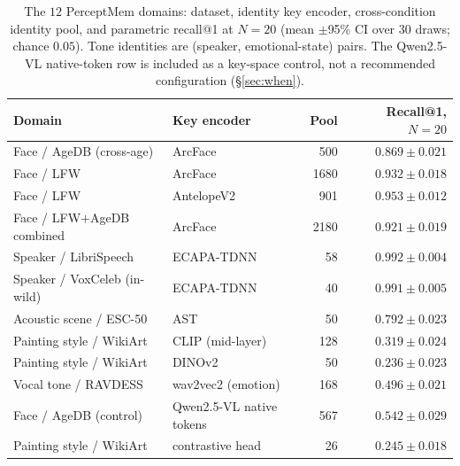\begin{table}[h]
\small\centering
\caption{The $12$ PerceptMem domains: dataset, identity key encoder, cross-condition identity pool, and parametric recall@1 at $N{=}20$ (mean $\pm$95\% CI over $30$ draws; chance $0.05$). Tone identities are (speaker, emotional-state) pairs. The Qwen2.5-VL native-token row is included as a key-space control, not a recommended configuration (\S\ref{sec:when}).}
\label{tab:domains}
\begin{tabular}{@{}llrr@{}}
\toprule
\textbf{Domain} & \textbf{Key encoder} & \textbf{Pool} & \textbf{Recall@1, $N{=}20$} \\
\midrule
Face / AgeDB (cross-age)        & ArcFace                & 500  & $0.869 \pm 0.021$ \\
Face / LFW                      & ArcFace                & 1680 & $0.932 \pm 0.018$ \\
Face / LFW                      & AntelopeV2             & 901  & $0.953 \pm 0.012$ \\
Face / LFW$+$AgeDB combined     & ArcFace                & 2180 & $0.921 \pm 0.019$ \\
Speaker / LibriSpeech           & ECAPA-TDNN             & 58   & $0.992 \pm 0.004$ \\
Speaker / VoxCeleb (in-wild)    & ECAPA-TDNN             & 40   & $0.991 \pm 0.005$ \\
Acoustic scene / ESC-50         & AST                    & 50   & $0.792 \pm 0.023$ \\
Painting style / WikiArt        & CLIP (mid-layer)       & 128  & $0.319 \pm 0.024$ \\
Painting style / WikiArt        & DINOv2~\citep{dinov2}  & 50   & $0.236 \pm 0.023$ \\
Vocal tone / RAVDESS            & wav2vec2 (emotion)     & 168  & $0.496 \pm 0.021$ \\
Face / AgeDB (control)          & Qwen2.5-VL native tokens & 567 & $0.542 \pm 0.029$ \\
Painting style / WikiArt        & contrastive head       & 26   & $0.245 \pm 0.018$ \\
\bottomrule
\end{tabular}
\end{table}

